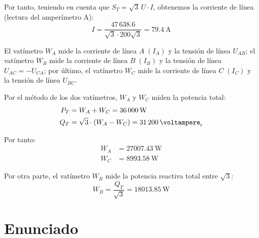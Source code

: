 Por tanto, teniendo en cuenta que $S_T = \sqrt{3} \, U \cdot I$, obtenemos la corriente de línea (lectura del amperímetro A):
\begin{equation*}
  I = \frac{47\,638.6}{\sqrt{3} \cdot 200\sqrt{3}} = \qty{79.4}{\ampere}
\end{equation*}


El vatímetro $W_A$ mide la corriente de línea $A\;(I_A)$ y la tensión de línea $U_{AB}$; el vatímetro $W_B$ mide la corriente de línea $B\;(I_B)$ y la tensión de línea $U_{AC}=-U_{CA}$; por último, el vatímetro $W_C$ mide la corriente de línea $C\;(I_C)$ y la tensión de línea $U_{BC}$.

\vspace{3mm}
Por el método de los dos vatímetros, $W_A$ y $W_C$ miden la potencia total: 
\begin{align*}
  P_T &= W_A + W_C =\qty{36000}{\watt}\\
  Q_T &= \sqrt{3}\cdot (W_A - W_C) = \qty{31200}{\voltampere_r}
\end{align*}

Por tanto:
\begin{align*}
  W_A &= \qty{27007.43}{\watt}\\
  W_C &= \qty{8993.58}{\watt}
\end{align*}

Por otra parte, el vatímetro $W_B$ mide la potencia reactiva total entre $\sqrt{3}$:
\begin{equation*}
  W_B = \frac{Q_T}{\sqrt{3}}=\qty{18013.85}{\watt}
\end{equation*}



\section{Enunciado}
 
